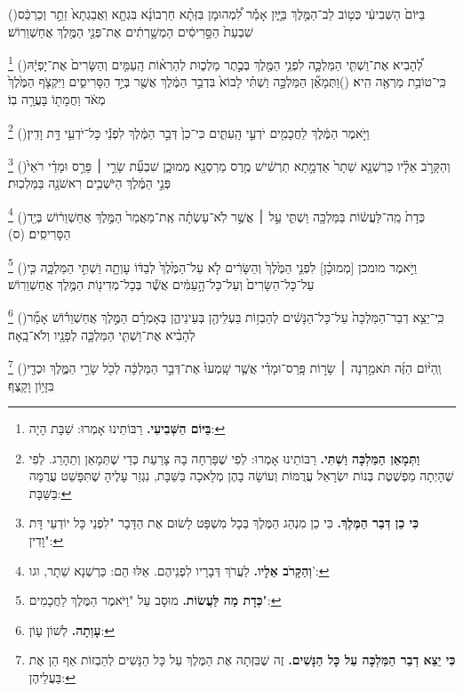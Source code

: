 \documentclass[12pt, openany]{book}
\newcommand{\footnotecomment}[1]{
	\renewcommand\thefootnote{}
	\footnote{\textsf{#1}}}
\newcommand{\commenta}[1]{\footnotecomment{#1}\hspace{0em}}
\newcommand{\vsnum}[1]{(\hebrewnumeral{#1})\space}
\begin{document}
\begin{multicols}{2}
\vsnum{10}בַּיּוֹם֙ הַשְּׁבִיעִ֔י כְּט֥וֹב לֵב־הַמֶּ֖לֶךְ בַּיָּ֑יִן אָמַ֡ר לִ֠מְהוּמָן בִּזְּתָ֨א חַרְבוֹנָ֜א בִּגְתָ֤א וַאֲבַגְתָא֙ זֵתַ֣ר וְכַרְכַּ֔ס שִׁבְעַת֙ הַסָּ֣רִיסִ֔ים הַמְשָׁ֣רְתִ֔ים אֶת־פְּנֵ֖י הַמֶּ֥לֶךְ אֲחַשְׁוֵרֽוֹשׁ׃%
\commenta{\textrm{\textbf{בַּיּוֹם הַשְּׁבִיעִי.}} רַבּוֹתֵינוּ אָמְרוּ: שַׁבָּת הָיָה:}%
\vsnum{11}לְ֠הָבִיא אֶת־וַשְׁתִּ֧י הַמַּלְכָּ֛ה לִפְנֵ֥י הַמֶּ֖לֶךְ בְּכֶ֣תֶר מַלְכ֑וּת לְהַרְא֨וֹת הָֽעַמִּ֤ים וְהַשָּׂרִים֙ אֶת־יָפְיָ֔הּ כִּֽי־טוֹבַ֥ת מַרְאֶ֖ה הִֽיא׃
\vsnum{12}וַתְּמָאֵ֞ן הַמַּלְכָּ֣ה וַשְׁתִּ֗י לָבוֹא֙ בִּדְבַ֣ר הַמֶּ֔לֶךְ אֲשֶׁ֖ר בְּיַ֣ד הַסָּרִיסִ֑ים וַיִּקְצֹ֤ף הַמֶּ֙לֶךְ֙ מְאֹ֔ד וַחֲמָת֖וֹ בָּעֲרָ֥ה בֽוֹ׃%
\commenta{\textrm{\textbf{וַתְּמָאֵן הַמַּלְכָּה וַשְׁתִּי.}} רַבּוֹתֵינוּ אָמְרוּ: לְפִי שֶׁפָּרְחָה בָהּ צָרַעַת כְּדֵי שֶׁתְּמָאֵן וְתֵהָרֵג. לְפִי שֶׁהָיְתָה מַפְשֶׁטֶת בְּנוֹת יִשְׂרָאֵל עֲרֻמּוֹת וְעוֹשָׂה בָהֶן מְלָאכָה בַּשַּׁבָּת, נִגְזַר עָלֶיהָ שֶׁתִּפָּשֵׁט עֲרֻמָּה בַּשַּׁבָּת: }%
\vsnum{13}וַיֹּ֣אמֶר הַמֶּ֔לֶךְ לַחֲכָמִ֖ים יֹדְעֵ֣י הָֽעִתִּ֑ים כִּי־כֵן֙ דְּבַ֣ר הַמֶּ֔לֶךְ לִפְנֵ֕י כָּל־יֹדְעֵ֖י דָּ֥ת וָדִֽין׃%
\commenta{\textrm{\textbf{כִּי כֵן דְּבַר הַמֶּלֶךְ.}} כִּי כֵן מִנְהַג הַמֶּלֶךְ בְּכָל מִשְׁפָּט לָשׂוּם אֶת הַדָּבָר "לִפְנֵי כָּל יוֹדְעֵי דָּת וָדִין": }%
\vsnum{14}וְהַקָּרֹ֣ב אֵלָ֗יו כַּרְשְׁנָ֤א שֵׁתָר֙ אַדְמָ֣תָא תַרְשִׁ֔ישׁ מֶ֥רֶס מַרְסְנָ֖א מְמוּכָ֑ן שִׁבְעַ֞ת שָׂרֵ֣י ׀ פָּרַ֣ס וּמָדַ֗י רֹאֵי֙ פְּנֵ֣י הַמֶּ֔לֶךְ הַיֹּשְׁבִ֥ים רִאשֹׁנָ֖ה בַּמַּלְכֽוּת׃%
\commenta{\textrm{\textbf{וְהַקָּרֹב אֵלָיו.}} לַעֲרֹךְ דְּבָרָיו לִפְנֵיהֶם. אֵלּוּ הֵם: כַּרְשְׁנָא שֵׁתָר, וגו': }%
\vsnum{15}כְּדָת֙ מַֽה־לַּעֲשׂ֔וֹת בַּמַּלְכָּ֖ה וַשְׁתִּ֑י עַ֣ל ׀ אֲשֶׁ֣ר לֹֽא־עָשְׂתָ֗ה אֶֽת־מַאֲמַר֙ הַמֶּ֣לֶךְ אֲחַשְׁוֵר֔וֹשׁ בְּיַ֖ד הַסָּרִיסִֽים׃ (ס)%
\commenta{\textrm{\textbf{כְּדָת מַה לַּעֲשׂוֹת.}} מוּסָב עַל "וַיֹּאמֶר הַמֶּלֶךְ לַחֲכָמִים": }%
\vsnum{16}וַיֹּ֣אמֶר מומכן [מְמוּכָ֗ן] לִפְנֵ֤י הַמֶּ֙לֶךְ֙ וְהַשָּׂרִ֔ים לֹ֤א עַל־הַמֶּ֙לֶךְ֙ לְבַדּ֔וֹ עָוְתָ֖ה וַשְׁתִּ֣י הַמַּלְכָּ֑ה כִּ֤י עַל־כָּל־הַשָּׂרִים֙ וְעַל־כָּל־הָ֣עַמִּ֔ים אֲשֶׁ֕ר בְּכָל־מְדִינ֖וֹת הַמֶּ֥לֶךְ אֲחַשְׁוֵרֽוֹשׁ׃%
\commenta{\textrm{\textbf{עָוְתָה.}} לְשׁוֹן עָו‍ֹן:}%
\vsnum{17}כִּֽי־יֵצֵ֤א דְבַר־הַמַּלְכָּה֙ עַל־כָּל־הַנָּשִׁ֔ים לְהַבְז֥וֹת בַּעְלֵיהֶ֖ן בְּעֵינֵיהֶ֑ן בְּאָמְרָ֗ם הַמֶּ֣לֶךְ אֲחַשְׁוֵר֡וֹשׁ אָמַ֞ר לְהָבִ֨יא אֶת־וַשְׁתִּ֧י הַמַּלְכָּ֛ה לְפָנָ֖יו וְלֹא־בָֽאָה׃%
\commenta{\textrm{\textbf{כִּי יֵצֵא דְבַר הַמַּלְכָּה עַל כָּל הַנָּשִׁים.}} זֶה שֶׁבִּזְּתָה אֶת הַמֶּלֶךְ עַל כָּל הַנָּשִׁים לְהַבְזוֹת אַף הֵן אֶת בַּעֲלֵיהֶן:}%
\vsnum{18}וְֽהַיּ֨וֹם הַזֶּ֜ה תֹּאמַ֣רְנָה ׀ שָׂר֣וֹת פָּֽרַס־וּמָדַ֗י אֲשֶׁ֤ר שָֽׁמְעוּ֙ אֶת־דְּבַ֣ר הַמַּלְכָּ֔ה לְכֹ֖ל שָׂרֵ֣י הַמֶּ֑לֶךְ וּכְדַ֖י בִּזָּי֥וֹן וָקָֽצֶף׃%

\end{multicols}
\end{document}
